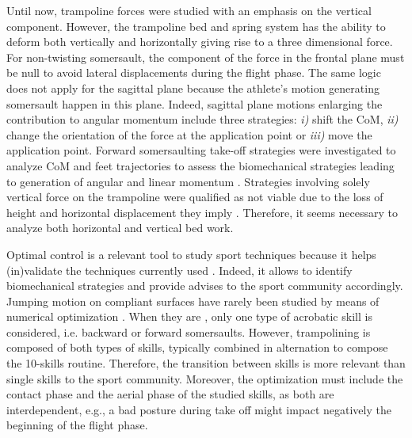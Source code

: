 Until now, trampoline forces were studied with an emphasis on the vertical component.
However, the trampoline bed and spring system has the ability to deform both vertically and horizontally giving rise to a three dimensional force.
For non-twisting somersault, the component of the force in the frontal plane must be null to avoid lateral displacements during the flight phase.
The same logic does not apply for the sagittal plane because the athlete's motion 
generating somersault happen in this plane.
Indeed, sagittal plane motions enlarging the contribution to angular momentum include three strategies: \textit{i)} shift the CoM, \textit{ii)} change the orientation of the force at the application point or \textit{iii)} move the application point.
Forward somersaulting take-off strategies were investigated to analyze CoM and feet trajectories to assess the biomechanical strategies leading to generation of angular and linear momentum \cite{lephartatiner}.
Strategies involving solely vertical force on the trampoline were qualified as not viable due to the loss of height and horizontal displacement they imply \cite{lephartatiner}.
Therefore, it seems necessary to analyze both horizontal and vertical bed work.


Optimal control is a relevant tool to study sport techniques because it helps (in)validate the techniques currently used \cite{charbonneau2020optimal}.
Indeed, it allows to identify biomechanical strategies and provide advises to the sport community accordingly.
Jumping motion on compliant surfaces have rarely been studied by means of numerical optimization \cite{cheng2008role, burke2015mechanics}.
When they are , only one type of acrobatic skill is considered, i.e. backward or forward somersaults.
However, trampolining is composed of both types of skills, typically combined in alternation to compose the  10-skills routine. 
Therefore,  the transition between skills is more relevant than single skills to the sport community.
Moreover, the optimization must include the contact phase and the aerial phase of the studied skills, as both are interdependent, e.g., a bad posture during take off might impact negatively the beginning of the flight phase. 


